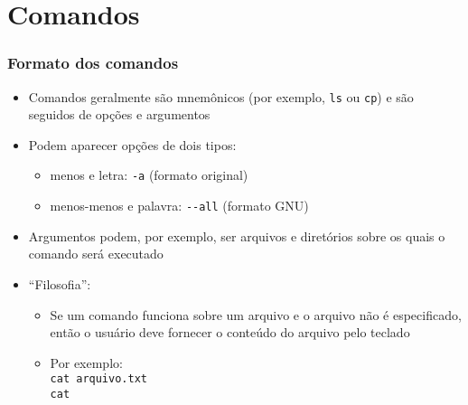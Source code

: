 \documentclass[aspectratio=169]{beamer}
\begin{document}
\section{Comandos}

\begin{frame}\frametitle{Formato dos comandos}
\begin{itemize}
	\item Comandos geralmente são mnemônicos (por exemplo, \texttt{ls} ou \texttt{cp}) e são seguidos de opções e argumentos
	\item Podem aparecer opções de dois tipos:
	\begin{itemize}
		\item menos e letra: \texttt{-a} (formato original)
		\item menos-menos e palavra: \texttt{-{}-all} (formato GNU)
	\end{itemize}
	\item Argumentos podem, por exemplo, ser arquivos e diretórios sobre os quais o comando será executado
	\item ``Filosofia'':
	\begin{itemize}
		\item Se um comando funciona sobre um arquivo e o arquivo não é especificado, então o usuário deve fornecer o conteúdo do arquivo pelo teclado
		\item Por exemplo:\\\texttt{cat arquivo.txt\\cat}
	\end{itemize}
\end{itemize}
\end{frame}
\end{document}
